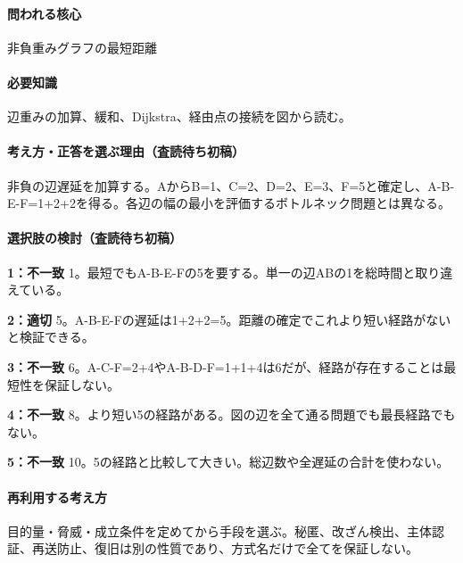 \paragraph{問われる核心} 非負重みグラフの最短距離

\paragraph{必要知識} 辺重みの加算、緩和、Dijkstra、経由点の接続を図から読む。

\paragraph{考え方・正答を選ぶ理由（査読待ち初稿）} 非負の辺遅延を加算する。AからB=\allowbreak{}1、C=\allowbreak{}2、D=\allowbreak{}2、E=\allowbreak{}3、F=\allowbreak{}5と確定し、A-B-E-F=\allowbreak{}1+2+2を得る。各辺の幅の最小を評価するボトルネック問題とは異なる。

\paragraph{選択肢の検討（査読待ち初稿）}\mbox{}\par

\noindent\textbf{1：不一致} 1。最短でもA-B-E-Fの5を要する。単一の辺ABの1を総時間と取り違えている。\par

\noindent\textbf{2：適切} 5。A-B-E-Fの遅延は1+2+2=\allowbreak{}5。距離の確定でこれより短い経路がないと検証できる。\par

\noindent\textbf{3：不一致} 6。A-C-F=\allowbreak{}2+4やA-B-D-F=\allowbreak{}1+1+4は6だが、経路が存在することは最短性を保証しない。\par

\noindent\textbf{4：不一致} 8。より短い5の経路がある。図の辺を全て通る問題でも最長経路でもない。\par

\noindent\textbf{5：不一致} 10。5の経路と比較して大きい。総辺数や全遅延の合計を使わない。\par

\paragraph{再利用する考え方} 目的量・脅威・成立条件を定めてから手段を選ぶ。秘匿、改ざん検出、主体認証、再送防止、復旧は別の性質であり、方式名だけで全てを保証しない。

